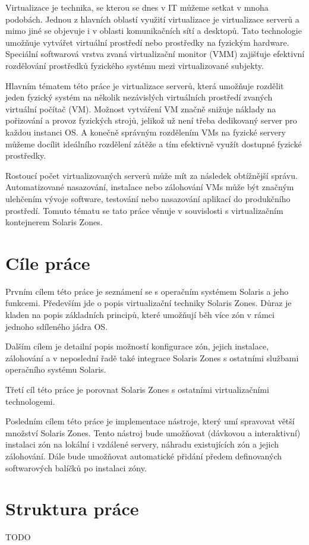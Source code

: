 Virtualizace je technika, se kterou se dnes v IT můžeme setkat v mnoha podobách. Jednou z hlavních oblastí využití virtualizace je virtualizace serverů a mimo jiné se objevuje i v oblasti
komunikačních sítí a desktopů. Tato technologie umožňuje vytvářet virtuální prostředí nebo prostředky na fyzickým hardware. Speciální softwarová vrstva zvaná virtualizační monitor (VMM)
zajišťuje efektivní rozdělování prostředků fyzického systému mezi virtualizované subjekty.

Hlavním tématem této práce je virtualizace serverů, která umožňuje rozdělit jeden fyzický systém na několik nezávislých virtuálních prostředí zvaných virtuální počítač (VM).
Možnost vytváření VM značně snižuje náklady na pořizování a provoz fyzických strojů, jelikož už není třeba dedikovaný server pro každou instanci OS. A konečně správným rozdělením
VMs na fyzické servery můžeme docílit ideálního rozdělení zátěže a tím efektivně využít dostupné fyzické prostředky.

Rostoucí počet virtualizovaných serverů může mít za následek obtížnější správu. Automatizované nasazování, instalace nebo zálohování VMs může být značným ulehčením vývoje software,
testování nebo nasazování aplikací do produkčního prostředí. Tomuto tématu se tato práce věnuje v souvislosti s virtualizačním kontejnerem Solaris Zones.

\section{Cíle práce}

Prvním cílem této práce je seznámení se s operačním systémem Solaris a jeho funkcemi. Především jde o popis virtualizační techniky Solaris Zones. Důraz je kladen na popis
základních principů, které umožňují běh více zón v rámci jednoho sdíleného jádra OS.

Dalším cílem je detailní popis možností konfigurace zón, jejich instalace, zálohování a v neposlední řadě také integrace Solaris Zones s ostatními službami operačního systému
Solaris.

Třetí cíl této práce je porovnat Solaris Zones s ostatními virtualizačními technologemi.

Posledním cílem této práce je implementace nástroje, který umí spravovat větší množství Solaris Zones. Tento nástroj bude umožňovat (dávkovou a interaktivní) instalaci zón na
lokální i vzdálené servery, náhradu existujících zón a jejich zálohování. Dále bude umožňovat automatické přidání předem definovaných softwarových balíčků po instalaci zóny.

\section{Struktura práce}

TODO

